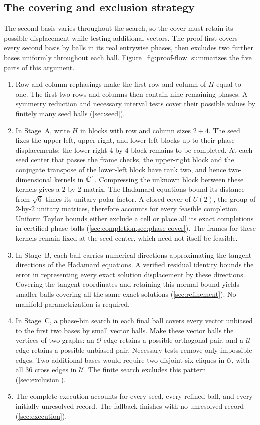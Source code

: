 \subsection{The covering and exclusion strategy}

The second basis varies throughout the search, so the cover must retain
its possible displacement while testing additional vectors. The proof
first covers every second basis by balls in its real entrywise phases,
then excludes two further bases uniformly throughout each ball.
Figure~\ref{fig:proof-flow} summarizes the five parts of this argument.
\begin{enumerate}
\item Row and column rephasings make the first row and column of $H$
equal to one. The first two rows and columns then contain nine remaining
phases. A symmetry reduction and necessary interval tests cover their
possible values by finitely many seed balls (\cref{sec:seed}).
\item In Stage~A, write $H$ in blocks with row and column sizes $2+4$.
The seed fixes the upper-left, upper-right, and lower-left blocks up to
their phase displacements; the lower-right $4$-by-$4$ block remains to
be completed. At each seed center that passes the frame checks, the
upper-right block and the conjugate transpose of the lower-left block
have rank two, and hence two-dimensional kernels in $\mathbb C^4$. Compressing
the unknown block between these kernels gives a $2$-by-$2$ matrix.
The Hadamard equations bound
its distance from $\sqrt6$ times its unitary polar factor. A closed
cover of $U(2)$, the group of $2$-by-$2$ unitary matrices, therefore
accounts for every feasible completion. Uniform Taylor bounds either
exclude a cell or place all its exact completions in certified phase
balls (\cref{sec:completion,sec:phase-cover}). The frames for these kernels
remain fixed at the seed center, which need not itself be feasible.
\item In Stage~B, each ball carries numerical directions approximating
the tangent directions of the Hadamard equations. A verified residual
identity bounds the error in representing every exact solution
displacement by these directions. Covering the tangent coordinates and retaining
this normal bound yields smaller balls covering all the same exact
solutions (\cref{sec:refinement}). No manifold parametrization is required.
\item In Stage~C, a phase-bin search in each final ball covers every
vector unbiased to the first two bases by small vector balls. Make
these vector balls the vertices of two graphs: an $\mathcal O$ edge
retains a possible orthogonal pair, and a $\mathcal U$ edge retains a
possible unbiased pair. Necessary tests remove only impossible edges.
Two additional bases would require two disjoint six-cliques in
$\mathcal O$, with all $36$ cross edges in $\mathcal U$. The finite
search excludes this pattern (\cref{sec:exclusion}).
\item The complete execution accounts for every seed, every refined
ball, and every initially unresolved record. The fallback finishes
with no unresolved record (\cref{sec:execution}).
\end{enumerate}

